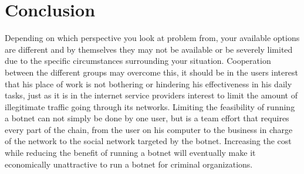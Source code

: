 \section{Conclusion}
Depending on which perspective you look at problem from, your available options are different and by themselves they may not be available or be severely limited due to the specific circumstances surrounding your situation. Cooperation between the different groups may overcome this, it should be in the users interest that his place of work is not bothering or hindering his effectiveness in his daily tasks, just as it is in the internet service providers interest to limit the amount of illegitimate traffic going through its networks. Limiting the feasibility of running a botnet can not simply be done by one user, but is a team effort that requires every part of the chain, from the user on his computer to the business in charge of the network to the social network targeted by the botnet.
Increasing the cost while reducing the benefit of running a botnet will eventually make it economically unattractive to run a botnet for criminal organizations.

